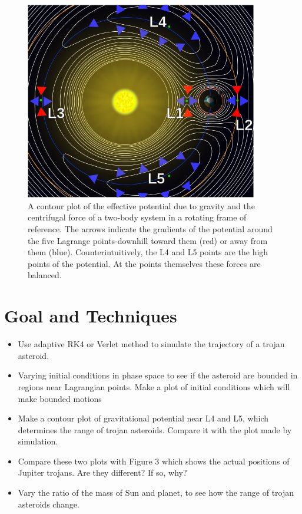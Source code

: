 \documentclass[12pt,a4paper]{article}
\begin{document}
\begin{figure}[H]
\centering
\includegraphics[width=4in]{704px-Lagrange_points2.png}
\caption{A contour plot of the effective potential due to gravity and the centrifugal force of a two-body system in a rotating frame of reference. The arrows indicate the gradients of the potential around the five Lagrange points-downhill toward them (red) or away from them (blue). Counterintuitively, the L4 and L5 points are the high points of the potential. At the points themselves these forces are balanced.}
\end{figure}



\section{Goal and Techniques}

\begin{itemize}
	\item Use adaptive RK4 or Verlet method to simulate the trajectory of a trojan asteroid.
	\item Varying initial conditions in phase space to see if the asteroid are bounded in regions near Lagrangian points. Make a plot of initial conditions which will make bounded motions
	\item  Make a contour plot of gravitational potential near L4 and L5, which determines the range of trojan asteroids. Compare it with the plot made by simulation.
	\item Compare these two plots with Figure 3 which shows the actual positions of Jupiter trojans. Are they different? If so, why?
	\item Vary the ratio of the mass of Sun and planet, to see how the range of trojan asteroids change.
\end{itemize}
\end{document}

